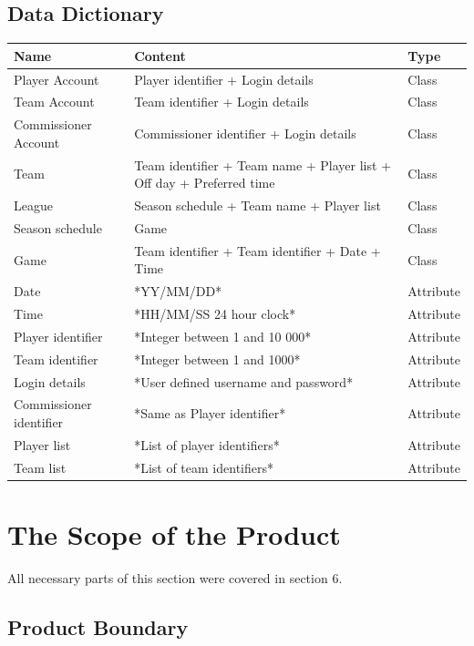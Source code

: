 \documentclass[12pt]{article}
\begin{document}
\subsection{Data Dictionary}
\begin{center}
  \begin{tabular}{|m{3cm}|m{8cm}|m{2cm}|}
    \hline
    Name & Content & Type\\
    \hline
    Player Account & Player identifier + Login details & Class\\
    \hline
    Team Account & Team identifier + Login details & Class\\
    \hline
    Commissioner Account & Commissioner identifier + Login details & Class\\
    \hline
    Team & Team identifier + Team name + Player list + Off day + Preferred
    time & Class\\
    \hline
    League & Season schedule + Team name + Player list & Class\\
    \hline
    Season schedule & {Game} & Class\\
    \hline
    Game & Team identifier + Team identifier + Date + Time & Class\\
    \hline
    Date & *YY/MM/DD* & Attribute\\
    \hline
    Time & *HH/MM/SS 24 hour clock*& Attribute\\
    \hline
    Player identifier & *Integer between 1 and 10 000* & Attribute\\
    \hline
    Team identifier & *Integer between 1 and 1000* & Attribute\\
    \hline
    Login details & *User defined username and password*& Attribute\\
    \hline
    Commissioner identifier & *Same as Player identifier* & Attribute\\
    \hline
    Player list & *List of player identifiers* & Attribute\\
    \hline
    Team list & *List of team identifiers* & Attribute\\
    \hline
  \end{tabular}
\end{center}

\section{The Scope of the Product}
All necessary parts of this section were covered in section 6.
\subsection{Product Boundary}
\end{document}
